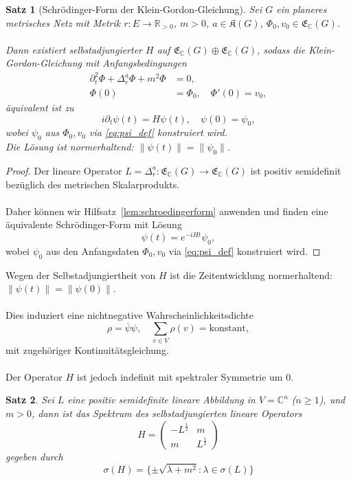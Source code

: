 \documentclass[11pt,a4paper,leqno]{report}
\newtheorem{proposition}{Satz}[chapter]
\numberwithin{equation}{chapter}
\begin{document}
\begin{proposition}[Schrödinger-Form der Klein-Gordon-Gleichung]
	Sei $G$ ein planeres metrisches Netz mit Metrik $r:E\to\mathbb{R}_{>0}$, $m>0$, $a\in\mathfrak{K}(G)$, 
	$\Phi_0,v_0\in\mathfrak{E}_\mathbb{C}(G)$. \\
	\\
	Dann existiert selbstadjungierter $H$ auf $\mathfrak{E}_\mathbb{C}(G)\oplus\mathfrak{E}_\mathbb{C}(G)$, sodass 
	die Klein-Gordon-Gleichung mit Anfangsbedingungen
	\begin{align}
		\partial_t^2\Phi + \Delta_r^a\Phi + m^2 \Phi &= 0,\\
		\Phi(0) &= \Phi_0, \quad \Phi'(0) = v_0,
	\end{align}
	äquivalent ist zu
	\begin{equation*}
		i\partial_t\psi(t) = H\psi(t), \quad \psi(0) = \psi_0,
	\end{equation*}
	wobei $\psi_0$ aus $\Phi_0,v_0$ via \eqref{eq:psi_def} konstruiert wird.
	\\
	Die Lösung ist normerhaltend: $\|\psi(t)\| = \|\psi_0\|$.
\end{proposition}
\begin{proof}
	Der lineare Operator $L = \Delta_r^a:\mathfrak{E}_\mathbb{C}(G)\to\mathfrak{E}_\mathbb{C}(G)$ 
	ist positiv semidefinit bezüglich des metrischen Skalarprodukts.\\
	\\
	Daher können wir Hilfsatz~\ref{lem:schroedingerform} anwenden und finden eine äquivalente Schrödinger-Form 
	mit Lösung 
	\begin{equation*}
		\psi(t) = e^{-i H t}\psi_0,
	\end{equation*} 
	wobei $\psi_0$ aus den Anfangsdaten $\Phi_0,v_0$ via \eqref{eq:psi_def} konstruiert wird.
\end{proof}
\noindent
Wegen der Selbstadjungiertheit von $H$ ist die Zeitentwicklung normerhaltend: $\|\psi(t)\| = \|\psi(0)\|$. 
\\
\\
Dies induziert eine nichtnegative Wahrscheinlichkeitsdichte 
$$
\rho = \overline{\psi}\psi, \quad \sum_{v\in V} \rho(v) = \text{konstant},
$$
mit zugehöriger Kontinuitätsgleichung.
\\
\\
Der Operator $H$ ist jedoch indefinit mit spektraler Symmetrie um $0$.
\begin{proposition}
	Sei $L$ eine positiv semidefinite lineare Abbildung in $V=\mathbb{C}^n$ ($n\geq 1$), und $m>0$, dann ist das Spektrum des selbstadjungierten lineare Operators
	\begin{equation}
		H=\begin{pmatrix}
			-L^\frac{1}{2} & m \\ 
			m & L^\frac{1}{2}
		\end{pmatrix}
	\end{equation} 
	gegeben durch 
		\begin{equation}
		\sigma(H)= \{\pm\sqrt{\lambda+m^2}:\lambda\in \sigma(L)\}
	\end{equation} 
\end{proposition}
\end{document}
